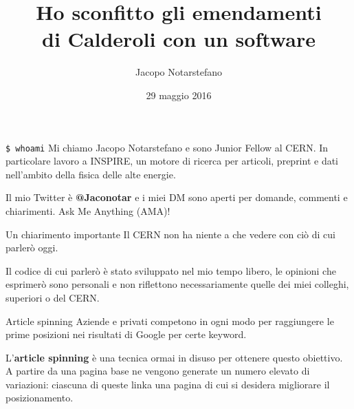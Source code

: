 \documentclass[12pt]{beamer}
\title{
  Ho sconfitto gli emendamenti\\
  di Calderoli con un software
}
\author{Jacopo Notarstefano}
\date{29 maggio 2016}
\begin{document}
  \begin{frame}[plain]
    \titlepage{}
  \end{frame}

  \begin{frame}{\texttt{\$ whoami}}
    Mi chiamo Jacopo Notarstefano e sono Junior Fellow al CERN\@. In particolare
    lavoro a INSPIRE, un motore di ricerca per articoli, preprint e dati
    nell'ambito della fisica delle alte energie.

    \vspace{0.5cm}

    Il mio Twitter è \textbf{@Jaconotar} e i miei DM sono aperti per domande,
    commenti e chiarimenti. Ask Me Anything (AMA)!
  \end{frame}

  \begin{frame}{Un chiarimento importante}
    Il CERN non ha niente a che vedere con ciò di cui parlerò oggi.

    \vspace{0.5cm}

    Il codice di cui parlerò è stato sviluppato nel mio tempo libero, le
    opinioni che esprimerò sono personali e non riflettono necessariamente
    quelle dei miei colleghi, superiori o del CERN.
  \end{frame}

  \begin{frame}{Article spinning}
    Aziende e privati competono in ogni modo per raggiungere le prime posizioni
    nei risultati di Google per certe keyword.

    \vspace{0.5cm}

    L'\textbf{article spinning} è una tecnica ormai in disuso per ottenere
    questo obiettivo. A partire da una pagina base ne vengono generate un numero
    elevato di variazioni: ciascuna di queste linka una pagina di cui si
    desidera migliorare il posizionamento.
  \end{frame}
\end{document}
